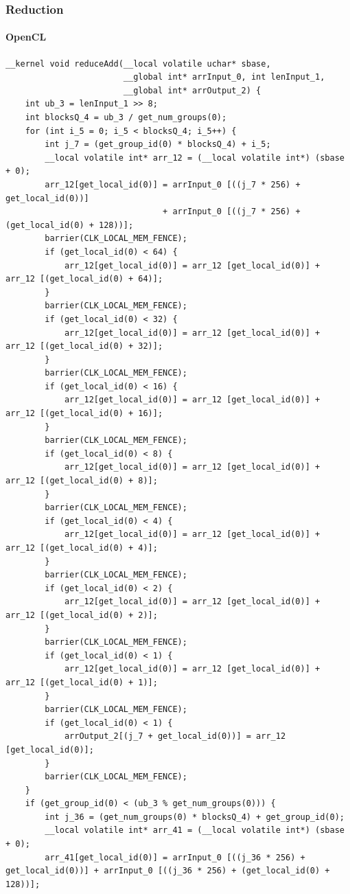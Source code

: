 \documentclass{beamer}
\begin{document}
\begin{frame}[fragile]
  \frametitle{Reduction}
  \framesubtitle{OpenCL}

{\tiny
\begin{verbatim}
__kernel void reduceAdd(__local volatile uchar* sbase,
                        __global int* arrInput_0, int lenInput_1,
                        __global int* arrOutput_2) {
    int ub_3 = lenInput_1 >> 8;
    int blocksQ_4 = ub_3 / get_num_groups(0);
    for (int i_5 = 0; i_5 < blocksQ_4; i_5++) {
        int j_7 = (get_group_id(0) * blocksQ_4) + i_5;
        __local volatile int* arr_12 = (__local volatile int*) (sbase + 0);
        arr_12[get_local_id(0)] = arrInput_0 [((j_7 * 256) + get_local_id(0))]
                                + arrInput_0 [((j_7 * 256) + (get_local_id(0) + 128))];
        barrier(CLK_LOCAL_MEM_FENCE);
        if (get_local_id(0) < 64) {
            arr_12[get_local_id(0)] = arr_12 [get_local_id(0)] + arr_12 [(get_local_id(0) + 64)];
        }
        barrier(CLK_LOCAL_MEM_FENCE);
        if (get_local_id(0) < 32) {
            arr_12[get_local_id(0)] = arr_12 [get_local_id(0)] + arr_12 [(get_local_id(0) + 32)];
        }
        barrier(CLK_LOCAL_MEM_FENCE);
        if (get_local_id(0) < 16) {
            arr_12[get_local_id(0)] = arr_12 [get_local_id(0)] + arr_12 [(get_local_id(0) + 16)];
        }
        barrier(CLK_LOCAL_MEM_FENCE);
        if (get_local_id(0) < 8) {
            arr_12[get_local_id(0)] = arr_12 [get_local_id(0)] + arr_12 [(get_local_id(0) + 8)];
        }
        barrier(CLK_LOCAL_MEM_FENCE);
        if (get_local_id(0) < 4) {
            arr_12[get_local_id(0)] = arr_12 [get_local_id(0)] + arr_12 [(get_local_id(0) + 4)];
        }
        barrier(CLK_LOCAL_MEM_FENCE);
        if (get_local_id(0) < 2) {
            arr_12[get_local_id(0)] = arr_12 [get_local_id(0)] + arr_12 [(get_local_id(0) + 2)];
        }
        barrier(CLK_LOCAL_MEM_FENCE);
        if (get_local_id(0) < 1) {
            arr_12[get_local_id(0)] = arr_12 [get_local_id(0)] + arr_12 [(get_local_id(0) + 1)];
        }
        barrier(CLK_LOCAL_MEM_FENCE);
        if (get_local_id(0) < 1) {
            arrOutput_2[(j_7 + get_local_id(0))] = arr_12 [get_local_id(0)];
        }
        barrier(CLK_LOCAL_MEM_FENCE);
    }
    if (get_group_id(0) < (ub_3 % get_num_groups(0))) {
        int j_36 = (get_num_groups(0) * blocksQ_4) + get_group_id(0);
        __local volatile int* arr_41 = (__local volatile int*) (sbase + 0);
        arr_41[get_local_id(0)] = arrInput_0 [((j_36 * 256) + get_local_id(0))] + arrInput_0 [((j_36 * 256) + (get_local_id(0) + 128))];

\end{verbatim}}
\end{frame}
\end{document}

